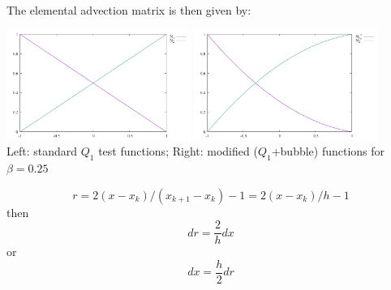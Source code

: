The elemental advection matrix is then given by:
\begin{center}
\includegraphics[width=6cm]{images/supg/bubble1}
\includegraphics[width=6cm]{images/supg/bubble2}\\
{\captionfont Left: standard $Q_1$ test functions; Right: modified ($Q_1$+bubble) functions
for $\beta=0.25$}
\end{center}

\[
r = 2(x-x_k)/(x_{k+1}-x_{k}) -1 =2(x-x_k)/h  -1
\]
then 
\[
dr = \frac{2}{h} dx
\]
or
\[
dx=\frac{h}{2} dr
\]


